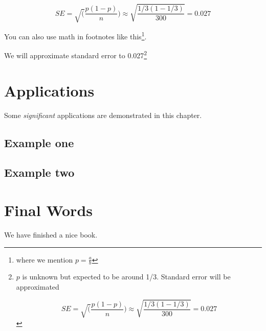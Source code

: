 \documentclass[
  openany]{book}
\begin{document}
\[
SE = \sqrt(\frac{p(1-p)}{n}) \approx \sqrt{\frac{1/3 (1 - 1/3)} {300}} = 0.027
\]

You can also use math in footnotes like this\footnote{where we mention \(p = \frac{a}{b}\)}.

We will approximate standard error to 0.027\footnote{\(p\) is unknown but expected to be around 1/3. Standard error will be approximated

  \[
  SE = \sqrt(\frac{p(1-p)}{n}) \approx \sqrt{\frac{1/3 (1 - 1/3)} {300}} = 0.027
  \]}

\hypertarget{applications}{%
\chapter{Applications}\label{applications}}

Some \emph{significant} applications are demonstrated in this chapter.

\hypertarget{example-one}{%
\section{Example one}\label{example-one}}

\hypertarget{example-two}{%
\section{Example two}\label{example-two}}

\hypertarget{final-words}{%
\chapter{Final Words}\label{final-words}}

We have finished a nice book.

  
\end{document}
